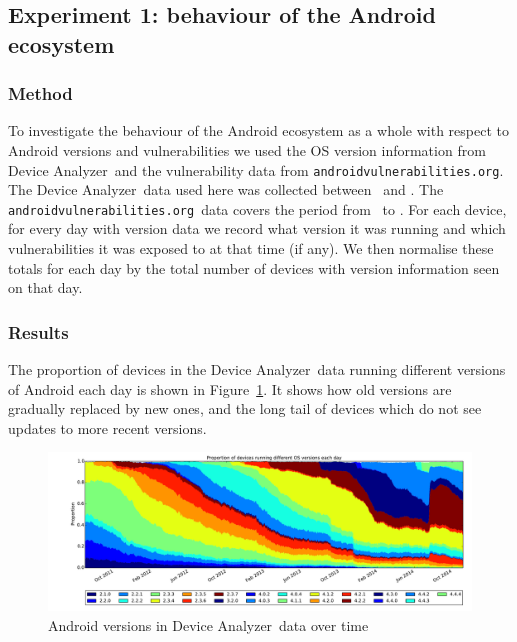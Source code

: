 \documentclass[conference,a4paper,twoside]{IEEEtran}
\newcommand{\da}{Device Analyzer}
\newcommand{\avo}{\texttt{androidvulnerabilities.org}}
\begin{document}

\subsection{Experiment 1: behaviour of the Android ecosystem}\label{sec:exp:android_ecosystem}

\subsubsection{Method}
To investigate the behaviour of the Android ecosystem as a whole with respect to Android versions and vulnerabilities we used the OS version information from \da\ and the vulnerability data from \avo.
The \da\ data used here was collected between \daStartDate\ and \daEndDate.
The \avo\ data covers the period from \avoFirstDataDate\ to \avoLastDataDate.
For each device, for every day with version data we record what version it was running and which vulnerabilities it was exposed to at that time (if any).
We then normalise these totals for each day by the total number of devices with version information seen on that day.

\subsubsection{Results}
The proportion of devices in the \da\ data running different versions of Android each day is shown in Figure~\ref{fig:norm_os}.
It shows how old versions are gradually replaced by new ones, and the long tail of devices which do not see updates to more recent versions.

\begin{figure}
 \centering
 \includegraphics[width=\textwidth]{figures/da_norm_os}
 \caption{Android versions in \da\ data over time}
 \label{fig:norm_os}
\end{figure}
\end{document}
